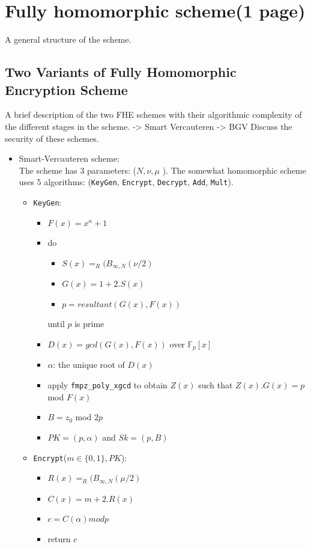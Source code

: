\documentclass{acm_proc_article-sp}
\begin{document}
\section{Fully homomorphic scheme(1 page)}
A general structure of the scheme.
\subsection{Two Variants of Fully Homomorphic Encryption Scheme}
A brief description of the two FHE schemes with their algorithmic complexity of the different stages in the scheme. 
-> Smart Vercauteren
-> BGV
Discuss the security of these schemes.



\begin{itemize}
\item Smart-Vercauteren scheme:\\
The scheme \cite{cryptoeprint:2009:571} has 3 parameters: ($N, \nu, \mu$ ). The somewhat homomorphic scheme uses 5 algorithms: (\texttt{KeyGen}, \texttt{Encrypt}, \texttt{Decrypt}, \texttt{Add}, \texttt{Mult}).
\begin{itemize}
\item \texttt{KeyGen}:
\begin{itemize}
\item $F(x)= x^{n}+1$
\item do
\begin{itemize}
\item $S(x)=_{R}(B_{\infty , N}(\nu/2)$
\item $G(x)=1+2.S(x)$
\item $p= resultant(G(x),F(x))$
\end{itemize}
until $p$ is prime
\item $D(x)=gcd(G(x),F(x))$ over $\mathbb{F}_p[x]$
\item $\alpha$: the unique root of $D(x)$
\item apply \texttt{fmpz\_poly\_xgcd} to obtain $Z(x)$ such that $Z(x).G(x)=p$ mod $F(x)$
\item $B=z_0$ mod $2p$
\item $PK = (p, \alpha)$ and $Sk = (p , B)$
\end{itemize}
\item \texttt{Encrypt}($m \in \{0,1\} , PK$):
\begin{itemize}
\item $R(x)=_{R}(B_{\infty , N}(\mu/2)$
\item $C(x)=m+2.R(x)$
\item $c=C(\alpha) mod p$
\item return $c$

\end{itemize}
\end{itemize}
\end{itemize}
\end{document}
